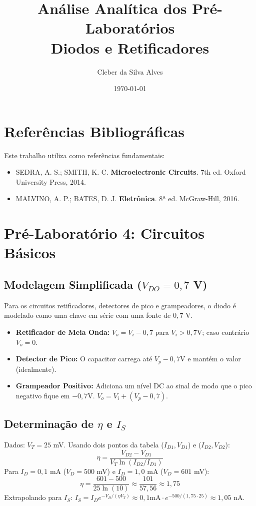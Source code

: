 \documentclass[12pt,a4paper]{article}
\title{Análise Analítica dos Pré-Laboratórios \\ \large Diodos e Retificadores}
\author{Cleber da Silva Alves}
\date{\today}
\begin{document}
\maketitle

\section*{Referências Bibliográficas}
Este trabalho utiliza como referências fundamentais:
\begin{itemize}
    \item SEDRA, A. S.; SMITH, K. C. \textbf{Microelectronic Circuits}. 7th ed. Oxford University Press, 2014.
    \item MALVINO, A. P.; BATES, D. J. \textbf{Eletrônica}. 8ª ed. McGraw-Hill, 2016.
\end{itemize}

\section{Pré-Laboratório 4: Circuitos Básicos}

\subsection{Modelagem Simplificada ($V_{DO} = 0,7$ V)}
Para os circuitos retificadores, detectores de pico e grampeadores, o diodo é modelado como uma chave em série com uma fonte de $0,7$ V.

\begin{itemize}
    \item \textbf{Retificador de Meia Onda:} $V_o = V_i - 0,7$ para $V_i > 0,7$V; caso contrário $V_o = 0$.
    \item \textbf{Detector de Pico:} O capacitor carrega até $V_p - 0,7$V e mantém o valor (idealmente).
    \item \textbf{Grampeador Positivo:} Adiciona um nível DC ao sinal de modo que o pico negativo fique em $-0,7$V. $V_o = V_i + (V_p - 0,7)$.
\end{itemize}

\subsection{Determinação de $\eta$ e $I_S$}
Dados: $V_T = 25$ mV. Usando dois pontos da tabela ($I_{D1}, V_{D1}$) e ($I_{D2}, V_{D2}$):
\begin{equation}
\eta = \frac{V_{D2} - V_{D1}}{V_T \ln(I_{D2}/I_{D1})}
\end{equation}
Para $I_D = 0,1$ mA ($V_D = 500$ mV) e $I_D = 1,0$ mA ($V_D = 601$ mV):
\begin{equation}
\eta = \frac{601 - 500}{25 \ln(10)} \approx \frac{101}{57,56} \approx 1,75
\end{equation}
Extrapolando para $I_S$: $I_S = I_D e^{-V_D/(\eta V_T)} \approx 0,1 \text{mA} \cdot e^{-500/(1,75 \cdot 25)} \approx 1,05 \text{ nA}$.
\end{document}

